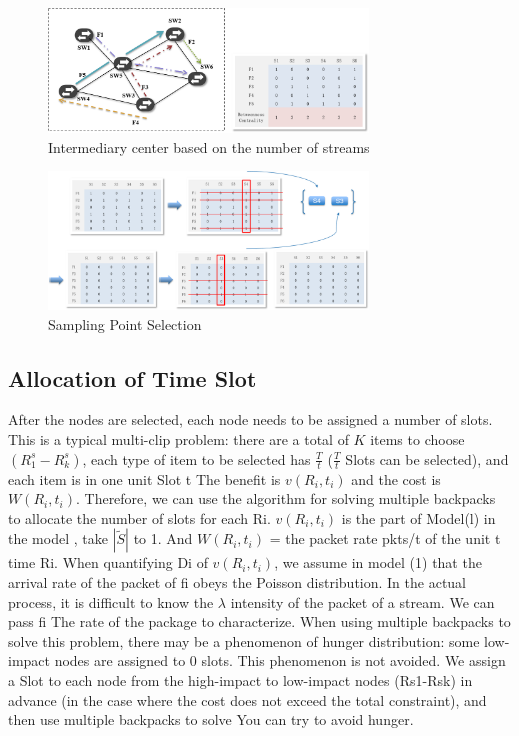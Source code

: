 \documentclass[conference,compsoc]{IEEEtran}
\begin{document}
\begin{figure}[!hhhhhhhhhht]
\centering
\includegraphics[width=8.5cm]{images/png_sampling_point.png}
\caption{Intermediary center based on the number of streams}
\label{png_sampling_point.png}
\end{figure}

\begin{figure}[!hhhhhhhhhht]
\centering
\includegraphics[width=8.5cm]{images/png_sampling_point_in.png}
\caption{Sampling Point Selection}
\label{png_sampling_point_in.png}
\end{figure}





\subsection{Allocation of Time Slot}


After the nodes are selected, each node needs to be assigned a number of slots. This is a typical multi-clip problem: there are a total of $K$ items to choose $(R^s_1-R^s_k)$, each type of item to be selected has $\frac{T}{t}$ ($\frac{T}{t}$ Slots can be selected), and each item is in one unit Slot t The benefit is $v(R_i, t_i)$ and the cost is $W(R_i, t_i)$. Therefore, we can use the algorithm for solving multiple backpacks to allocate the number of slots for each Ri. $v(R_i,t_i)$ is the part of Model(l)  in the model , take $ | \widetilde S |$ to 1. And $W(R_i, t_i)$ = the packet rate pkts/t of the unit t time Ri. When quantifying Di of $v(R_i, t_i)$, we assume in model (1) that the arrival rate of the packet of fi obeys the Poisson distribution. In the actual process, it is difficult to know the $\lambda $ intensity of the packet of a stream. We can pass fi The rate of the package to characterize.
When using multiple backpacks to solve this problem, there may be a phenomenon of hunger distribution: some low-impact nodes are assigned to 0 slots. This phenomenon is not avoided. We assign a Slot to each node from the high-impact to low-impact nodes (Rs1-Rsk) in advance (in the case where the cost does not exceed the total constraint), and then use multiple backpacks to solve You can try to avoid hunger.
\end{document}
